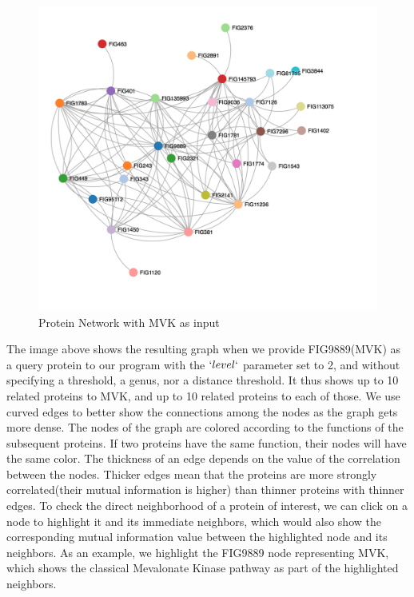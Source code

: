 \documentclass{ucetd}
\begin{document}
\begin{figure}[b!]
\centering
\includegraphics[scale=0.75]{FULLNetwork}
\caption{Protein Network with MVK as input}
\label{fig:Protein Network with MVK as input}
\end{figure}
\newpage
The image above shows the resulting graph when we provide FIG9889(MVK) as a query protein to our program with the  $`level`$ parameter set to 2, and without specifying a threshold, a genus, nor a distance threshold. It thus shows up to 10 related proteins to MVK, and up to 10 related proteins to each of those. 
We use curved edges to better show the connections among the nodes as the graph gets more dense. The nodes of the graph are colored according to the functions of the subsequent proteins. If two proteins have the same function, their nodes will have the same color. The thickness of an edge depends on the value of the correlation between the nodes. Thicker edges mean that the proteins are more strongly correlated(their mutual information is higher) than thinner proteins with thinner edges. 
To check the direct neighborhood of a protein of interest, we can click on a node to highlight it and its immediate neighbors, which would also show the corresponding mutual information value between the highlighted node and its neighbors. As an example, we highlight the FIG9889 node representing MVK, which shows the classical Mevalonate Kinase pathway as part of the highlighted neighbors.
\end{document}
